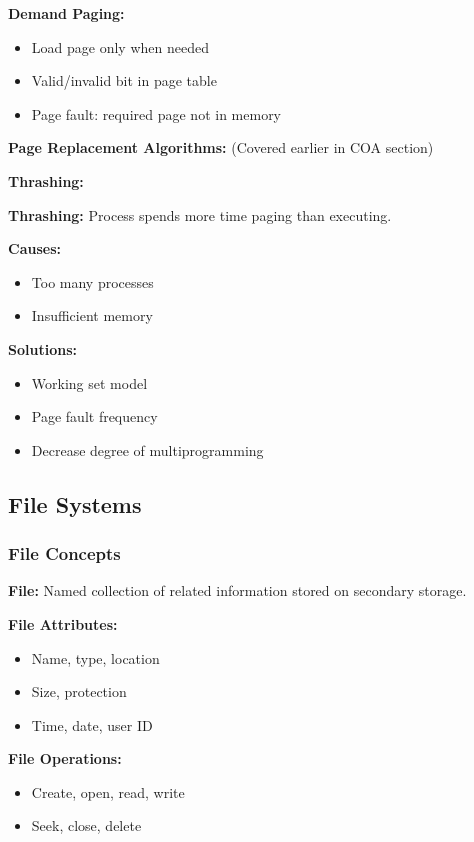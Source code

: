 \documentclass[11pt,a4paper]{article}
\begin{document}
\textbf{Demand Paging:}
\begin{itemize}
    \item Load page only when needed
    \item Valid/invalid bit in page table
    \item Page fault: required page not in memory
\end{itemize}

\textbf{Page Replacement Algorithms:} (Covered earlier in COA section)

\textbf{Thrashing:}
\begin{defbox}
\textbf{Thrashing:} Process spends more time paging than executing.
\end{defbox}

\textbf{Causes:}
\begin{itemize}
    \item Too many processes
    \item Insufficient memory
\end{itemize}

\textbf{Solutions:}
\begin{itemize}
    \item Working set model
    \item Page fault frequency
    \item Decrease degree of multiprogramming
\end{itemize}

\subsection{File Systems}

\subsubsection{File Concepts}

\begin{defbox}
\textbf{File:} Named collection of related information stored on secondary storage.
\end{defbox}

\textbf{File Attributes:}
\begin{itemize}
    \item Name, type, location
    \item Size, protection
    \item Time, date, user ID
\end{itemize}

\textbf{File Operations:}
\begin{itemize}
    \item Create, open, read, write
    \item Seek, close, delete
\end{itemize}
\end{document}
